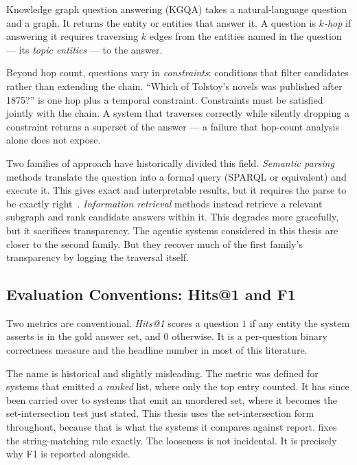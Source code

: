Knowledge graph question answering (KGQA) takes a
natural-language question and a graph. It returns the
entity or entities that answer it. A question is \emph{$k$-hop} if answering it
requires traversing $k$ edges from the entities named in the question --- its
\emph{topic entities} --- to the answer.

Beyond hop count, questions vary in \emph{constraints}: conditions that filter
candidates rather than extending the chain. ``Which of Tolstoy's novels was
published after 1875?'' is one hop plus a temporal constraint. Constraints must
be satisfied jointly with the chain. A system that traverses correctly while
silently dropping a constraint returns a superset of the answer --- a failure
that hop-count analysis alone does not expose.

Two families of approach have historically divided this field. \emph{Semantic
parsing} methods translate the question into a formal query (SPARQL or
equivalent) and execute it. This gives exact and interpretable results, but it
requires the parse to be exactly right~\cite{berant2013semantic,yih2016value}.
\emph{Information retrieval} methods instead retrieve a relevant subgraph and
rank candidate answers within it. This degrades more gracefully, but it
sacrifices transparency. The agentic systems considered in this thesis are
closer to the second family. But they recover much of the first family's
transparency by logging the traversal itself.

\subsection{Evaluation Conventions: Hits@1 and F1}

Two metrics are conventional. \emph{Hits@1} scores a question
$1$ if any entity the system asserts is in the gold answer set, and
$0$ otherwise. It is a per-question binary correctness measure and the headline
number in most of this literature.

The name is historical and slightly misleading. The metric was defined for
systems that emitted a \emph{ranked} list, where only the top entry counted. It
has since been carried over to systems that emit an unordered set, where it
becomes the set-intersection test just stated. This thesis uses the
set-intersection form throughout, because that is what the systems it compares
against report.  fixes the string-matching rule exactly. The
looseness is not incidental. It is precisely why F1 is reported alongside.

